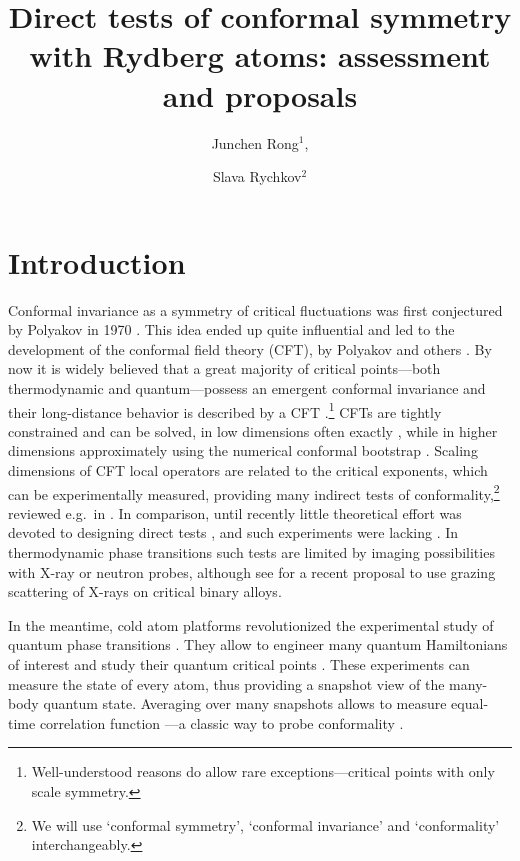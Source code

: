 \documentclass[a4paper,11pt]{article}
\title{Direct tests of conformal symmetry with Rydberg atoms: assessment and proposals}
\author{Junchen Rong$^1$,}
\author{Slava Rychkov$^2$}
\affiliation{$^1$CPHT, CNRS, \'Ecole Polytechnique, Institut Polytechnique de Paris, Palaiseau, France\\
$^2$Institut des Hautes \'Etudes Scientifiques, 91440 Bures-sur-Yvette, France}
\theoremstyle{remark}
\theoremstyle{theorem}
\begin{document}
 
	
	\maketitle
	
	\flushbottom


\flushbottom


\section{Introduction}

Conformal invariance as a symmetry of critical fluctuations was first conjectured by Polyakov in 1970 \cite{Polyakov:1970xd}. This idea ended up quite influential and led to the development of the conformal field theory (CFT), by Polyakov and others \cite{Polyakov:1974gs,Belavin:1984vu}. By now it is widely believed that a great majority of critical points---both thermodynamic and quantum---possess an emergent conformal invariance and their long-distance behavior is described by a CFT \cite{Cardy1987,Cardy:1996xt,tsvelik,giamarchi2003quantum,sachdev,fradkin}.\footnote{Well-understood reasons \cite{Polchinski:1987dy,Nakayama:2013is} do allow rare exceptions---critical points with only scale symmetry.} CFTs are tightly constrained and can be solved, in low dimensions often exactly \cite{DiFrancesco:1997nk}, while in higher dimensions approximately using the numerical conformal bootstrap \cite{Poland:2018epd}. Scaling dimensions of CFT local operators are related to the critical exponents, which can be experimentally measured, providing many indirect tests of conformality,\footnote{We will use `conformal symmetry', `conformal invariance' and `conformality' interchangeably.} reviewed e.g.~in \cite{Henkel1999,Rychkov:2025zks}. In comparison, until recently little theoretical effort was devoted to designing direct tests \cite{Pokrovskii1973,Gompper1985}, and such experiments were lacking \cite{Rychkov:2025zks}. In thermodynamic phase transitions such tests are limited by imaging possibilities with X-ray or neutron probes, although see \cite{Podo:2026hfh} for a recent proposal to use grazing scattering of X-rays on critical binary alloys.

In the meantime, cold atom platforms \cite{Browaeys:2020kzz,Morgado:2020jfo} revolutionized the experimental study of quantum phase transitions \cite{Bernien:2017ubn,Scholl:2020hzx,Ebadi:2020ldi,Semeghini:2021wls}. They allow to engineer many quantum Hamiltonians of interest and study their quantum critical points \cite{Keesling:2018ish,Fang:2024uyf,Sun:2026aqf}. These experiments can measure the state of every atom, thus providing a snapshot view of the many-body quantum state. Averaging over many snapshots allows to measure equal-time correlation function \cite{Fang:2024uyf,Emperauger:2025raf}---a classic way to probe conformality \cite{Polyakov:1970xd}.
\end{document}
